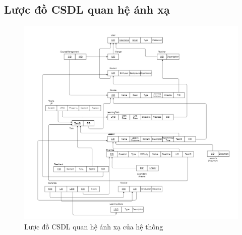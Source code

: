 \subsection{Lược đồ CSDL quan hệ ánh xạ}
\begin{figure}[h!]
    \centering
    \includegraphics[width=\linewidth]{Images/Anh/mapping.png}
    \caption{Lược đồ CSDL quan hệ ánh xạ của hệ thống}
    \label{fig:enter-label}
\end{figure}
\newpage
